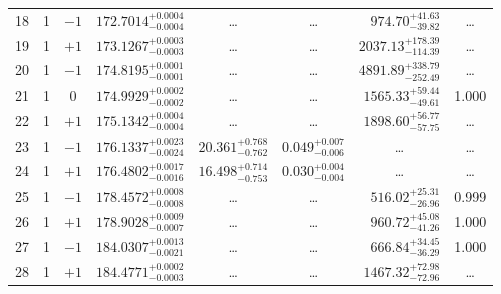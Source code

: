 \begin{table*}[!]
\begin{tabular}{llcrrlrc}
18 & 1 & $-1$ & $    172.7014_{-      0.0004}^{+      0.0004}$ & \multicolumn{1}{c}{\dots} & \multicolumn{1}{c}{\dots} & $      974.70_{-       39.82}^{+       41.63}$ & \dots \\[1pt]
19 & 1 & $+1$ & $    173.1267_{-      0.0003}^{+      0.0003}$ & \multicolumn{1}{c}{\dots} & \multicolumn{1}{c}{\dots} & $     2037.13_{-      114.39}^{+      178.39}$ & \dots \\[1pt]
20 & 1 & $-1$ & $    174.8195_{-      0.0001}^{+      0.0001}$ & \multicolumn{1}{c}{\dots} & \multicolumn{1}{c}{\dots} & $     4891.89_{-      252.49}^{+      338.79}$ & \dots \\[1pt]
21 & 1 & 0 & $    174.9929_{-      0.0002}^{+      0.0002}$ & \multicolumn{1}{c}{\dots} & \multicolumn{1}{c}{\dots} & $     1565.33_{-       49.61}^{+       59.44}$ & 1.000 \\[1pt]
22 & 1 & $+1$ & $    175.1342_{-      0.0004}^{+      0.0004}$ & \multicolumn{1}{c}{\dots} & \multicolumn{1}{c}{\dots} & $     1898.60_{-       57.75}^{+       56.77}$ & \dots \\[1pt]
23 & 1 & $-1$ & $    176.1337_{-      0.0024}^{+      0.0023}$ & $      20.361_{-       0.762}^{+       0.768}$ & $       0.049_{-       0.006}^{+       0.007}$ & \multicolumn{1}{c}{\dots} & \dots \\[1pt]
24 & 1 & $+1$ & $    176.4802_{-      0.0016}^{+      0.0017}$ & $      16.498_{-       0.753}^{+       0.714}$ & $       0.030_{-       0.004}^{+       0.004}$ & \multicolumn{1}{c}{\dots} & \dots \\[1pt]
25 & 1 & $-1$ & $    178.4572_{-      0.0008}^{+      0.0008}$ & \multicolumn{1}{c}{\dots} & \multicolumn{1}{c}{\dots} & $      516.02_{-       26.96}^{+       25.31}$ & 0.999\\[1pt]
26 & 1 & $+1$ & $    178.9028_{-      0.0007}^{+      0.0009}$ & \multicolumn{1}{c}{\dots} & \multicolumn{1}{c}{\dots} & $      960.72_{-       41.26}^{+       45.08}$ & 1.000\\[1pt]
27 & 1 & $-1$ & $    184.0307_{-      0.0021}^{+      0.0013}$ & \multicolumn{1}{c}{\dots} & \multicolumn{1}{c}{\dots} & $      666.84_{-       36.29}^{+       34.45}$ & 1.000\\[1pt]
28 & 1 & $+1$ & $    184.4771_{-      0.0003}^{+      0.0002}$ & \multicolumn{1}{c}{\dots} & \multicolumn{1}{c}{\dots} & $     1467.32_{-       72.96}^{+       72.98}$ & \dots \\[1pt]


\end{tabular}
\end{table*}
